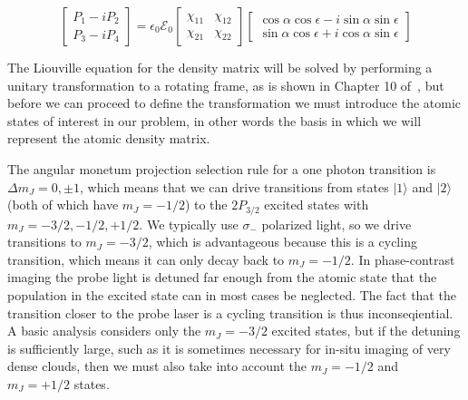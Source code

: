 \documentclass[11pt,letter]{article}
\newcommand{\efieldo}{\ensuremath{\mathcal{E}_{0}}}
\begin{document}
\begin{equation}
 \left[ \begin{matrix}  P_{1}-iP_{2} \\ P_{3}-iP_{4} \end{matrix} \right]
  =  \epsilon_{0}\efieldo 
 \left[ \begin{matrix}
     \chi_{11} & \chi_{12} \\ \chi_{21} & \chi_{22} 
 \end{matrix} \right]
 \left[ \begin{matrix}
      \cos\alpha \cos \epsilon - i \sin\alpha\sin\epsilon \\
      \sin\alpha \cos\epsilon + i \cos\alpha\sin\epsilon
 \end{matrix} \right]
\end{equation}




\newpage














The Liouville equation for the density matrix will be solved by performing a
unitary transformation to a rotating frame, as is shown in Chapter 10
of~\cite{auzinsh2010optically}, but before we can proceed to define the
transformation  we must introduce the atomic states of interest in our problem,
in other words the basis in which we will represent the atomic density matrix.


The angular monetum projection selection rule for a one photon transition is
$\Delta m_{J} = 0, \pm 1$, which means that we can drive transitions from
states $|1\rangle$ and $|2\rangle$ (both of which have $m_{J}=-1/2$) to the
$2P_{3/2}$ excited states with $m_{J} = -3/2, -1/2, +1/2$.  We typically use
$\sigma_{-}$ polarized light, so we drive transitions to $m_{J}=-3/2$, which is
advantageous because this is a cycling transition, which means it  can only
decay back to $m_{J}=-1/2$.  In phase-contrast imaging the probe light is
detuned far enough from the atomic state that the population in the excited
state can in most cases be neglected.  The fact that the transition closer to
the probe laser is a cycling transition is thus inconseqiential.   A basic
analysis considers only the $m_{J}=-3/2$ excited states, but if the detuning is
sufficiently large, such as it is sometimes necessary for in-situ imaging of
very dense clouds,  then we must also take into account the $m_{J}=-1/2$ and
$m_{J}=+1/2$ states. 
\end{document}
